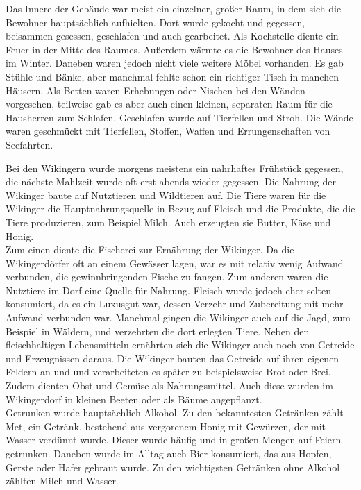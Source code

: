 \documentclass[12pt,a4paper,ngerman,openany]{book}
\begin{document}
Das Innere der Gebäude war meist ein einzelner, großer Raum, in dem sich die Bewohner hauptsächlich aufhielten. Dort wurde gekocht und gegessen, beisammen gesessen, geschlafen und auch gearbeitet. Als Kochstelle diente ein Feuer in der Mitte des Raumes. Außerdem wärmte es die Bewohner des Hauses im Winter. Daneben waren jedoch nicht viele weitere Möbel vorhanden. Es gab Stühle und Bänke, aber manchmal fehlte schon ein richtiger Tisch in manchen Häusern. Als Betten waren Erhebungen oder Nischen bei den Wänden vorgesehen, teilweise gab es aber auch einen kleinen, separaten Raum für die Hausherren zum Schlafen. Geschlafen wurde auf Tierfellen und Stroh. Die Wände waren geschmückt mit Tierfellen, Stoffen, Waffen und Errungenschaften von Seefahrten.

Bei den Wikingern wurde morgens meistens ein nahrhaftes Frühstück gegessen, die nächste Mahlzeit wurde oft erst abends wieder gegessen. Die Nahrung der Wikinger baute auf Nutztieren und Wildtieren auf. Die Tiere waren für die Wikinger die Hauptnahrungsquelle in Bezug auf Fleisch und die Produkte, die die Tiere produzieren, zum Beispiel Milch. Auch erzeugten sie Butter, Käse und Honig. \\
Zum einen diente die Fischerei zur Ernährung der Wikinger. Da die Wikingerdörfer oft an einem Gewässer lagen, war es mit relativ wenig Aufwand verbunden, die gewinnbringenden Fische zu fangen. Zum anderen waren die Nutztiere im Dorf eine Quelle für Nahrung. Fleisch wurde jedoch eher selten konsumiert, da es ein Luxusgut war, dessen Verzehr und Zubereitung mit mehr Aufwand verbunden war. Manchmal gingen die Wikinger auch auf die Jagd, zum Beispiel in Wäldern, und verzehrten die dort erlegten Tiere.
Neben den fleischhaltigen Lebensmitteln ernährten sich die Wikinger auch noch von Getreide und Erzeugnissen daraus. Die Wikinger bauten das Getreide auf ihren eigenen Feldern an und und verarbeiteten es später zu beispielsweise Brot oder Brei. Zudem dienten Obst und Gemüse als Nahrungsmittel. Auch diese wurden im Wikingerdorf in kleinen Beeten oder als Bäume angepflanzt.\\
Getrunken wurde hauptsächlich Alkohol. Zu den bekanntesten Getränken zählt Met, ein Getränk, bestehend aus vergorenem Honig mit Gewürzen, der mit Wasser verdünnt wurde. Dieser wurde häufig und in großen Mengen auf Feiern getrunken. Daneben wurde im Alltag auch Bier konsumiert, das aus Hopfen, Gerste oder Hafer gebraut wurde. Zu den wichtigsten Getränken ohne Alkohol zählten Milch und Wasser.
\end{document}
